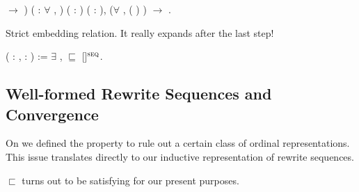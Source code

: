 \begin{singlespace}
\begin{coqdoccode}
\ensuremath{\rightarrow} )
( : \ensuremath{\forall} ,
 )\coqdoceol
\coqdocindent{5.00em}
( :
 
) (\coqdocvar{$\psi$} : 
),\coqdoceol
\coqdocindent{9.50em}
(\ensuremath{\forall} , ( )
 \coqdocvariable{$\psi$})
\ensuremath{\rightarrow}\coqdoceol
\coqdocindent{9.50em}
 
 
\coqdocvariable{$\psi$}.\coqdoceol
\end{coqdoccode}
\end{singlespace}

Strict embedding relation. It really expands after the last step!
\begin{singlespace}
\begin{coqdoccode}
\coqdocnoindent
{}
   
(\coqdocvar{$\varphi$} : 
,
\coqdocvar{$\psi$} :
) := \ensuremath{\exists} \coqdocvar{$\iota$},
\coqdocvariable{$\varphi$} $\sqsubseteq$
\coqdocvariable{$\psi$}[\coqdocvariable{$\iota$}]$^\textsc{seq}$.\coqdoceol
\end{coqdoccode}
\end{singlespace}


\subsection{Well-formed Rewrite Sequences and Convergence}\label{sub:wf}

On  we defined the
 property to rule out a certain
class of ordinal representations. This issue translates directly to our
inductive representation of rewrite sequences.

$\sqsubset$ turns out to be satisfying for our present purposes.

